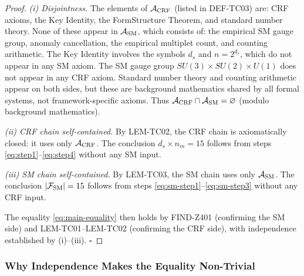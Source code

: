 \documentclass[12pt, a4paper]{article}
\begin{document}
\begin{proof}
\emph{(i) Disjointness.} The elements of $\mathcal{A}_{\rm CRF}$
(listed in DEF-TC03) are: CRF axioms, the Key Identity, the
FormStructure Theorem, and standard number theory. None of these
appear in $\mathcal{A}_{\rm SM}$, which consists of: the empirical
SM gauge group, anomaly cancellation, the empirical multiplet
count, and counting arithmetic. The Key Identity involves the
symbols $d_s$ and $n = 2^{d_s}$, which do not appear in any SM
axiom. The SM gauge group $SU(3) \times SU(2) \times U(1)$ does
not appear in any CRF axiom. Standard number theory and counting
arithmetic appear on both sides, but these are background mathematics
shared by all formal systems, not framework-specific axioms. Thus
$\mathcal{A}_{\rm CRF} \cap \mathcal{A}_{\rm SM} = \varnothing$
(modulo background mathematics).

\emph{(ii) CRF chain self-contained.} By LEM-TC02, the CRF
chain is axiomatically closed: it uses only $\mathcal{A}_{\rm CRF}$.
The conclusion $d_s \times n_m = 15$ follows from steps
\eqref{eq:step1}--\eqref{eq:step4} without any SM input.

\emph{(iii) SM chain self-contained.} By LEM-TC03, the SM chain
uses only $\mathcal{A}_{\rm SM}$. The conclusion
$|\mathcal{F}_{\rm SM}| = 15$ follows from steps
\eqref{eq:sm-step1}--\eqref{eq:sm-step3} without any CRF input.

The equality \eqref{eq:main-equality} then holds by FIND-Z401
(confirming the SM side) and LEM-TC01--LEM-TC02 (confirming the CRF
side), with independence established by (i)--(iii). \hfill$\square$
\end{proof}

\subsubsection{Why Independence Makes the Equality Non-Trivial}
\end{document}
